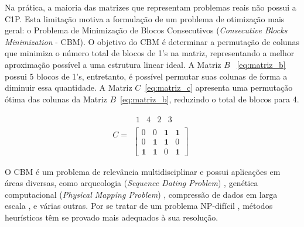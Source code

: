 Na prática, a maioria das matrizes que representam problemas reais não possui a C1P. Esta limitação motiva a formulação de um problema de otimização mais geral: o Problema de Minimização de Blocos Consecutivos (\textit{Consecutive Blocks Minimization} - CBM). O objetivo do CBM é determinar a permutação de colunas que minimiza o número total de blocos de 1's na matriz, representando a melhor aproximação possível a uma estrutura linear ideal. A Matriz $B$ ~\eqref{eq:matriz_b} possui 5 blocos de 1's, entretanto, é possível permutar suas colunas de forma a diminuir essa quantidade. A Matriz $C$~\eqref{eq:matriz_c} apresenta uma permutação ótima das colunas da Matriz $B$~\eqref{eq:matriz_b}, reduzindo o total de blocos para 4.

\begin{figure}[h!] %
    \centering
    \begin{minipage}{0.4\textwidth}
        \centering
        \begin{equation} \label{eq:matriz_c}
            C =
            \begin{array}{c}
                \begin{array}{cccc}
                    1 & 4 & 2 & 3
                \end{array} \\[3pt]
                \left[
                    \begin{array}{cccc}
                        0          & 0          & \mathbf{1} & \mathbf{1} \\
                        0          & \mathbf{1} & \mathbf{1} & 0          \\
                        \mathbf{1} & \mathbf{1} & 0          & \mathbf{1}
                    \end{array}
                    \right]
            \end{array}
        \end{equation}
    \end{minipage}
\end{figure}

O CBM é um problema de relevância multidisciplinar e possui aplicações em áreas diversas, como arqueologia (\textit{Sequence Dating Problem}) \cite{kendall1969incidence}, genética computacional (\textit{Physical Mapping Problem}) \cite{alizadeh1995physical}, compressão de dados em larga escala \cite{lemire2011reordering}, e várias outras. Por se tratar de um problema NP-difícil \cite{kou1977polynomial}, métodos heurísticos têm se provado mais adequados à sua resolução.

